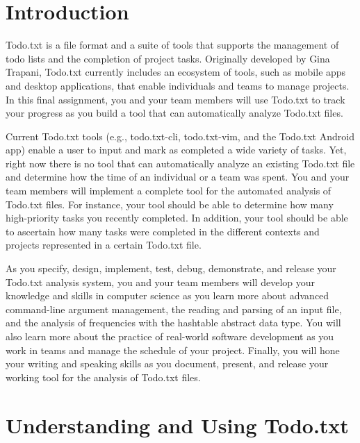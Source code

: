 


\usepackage[compact]{titlesec}


\section*{Introduction}

Todo.txt is a file format and a suite of tools that supports the management of todo lists and the completion of project
tasks. Originally developed by Gina Trapani, Todo.txt currently includes an ecosystem of tools, such as mobile apps and
desktop applications, that enable individuals and teams to manage projects. In this final assignment, you and your team
members will use Todo.txt to track your progress as you build a tool that can automatically analyze Todo.txt files.

Current Todo.txt tools (e.g., todo.txt-cli, todo.txt-vim, and the Todo.txt Android app) enable a user to input and mark
as completed a wide variety of tasks.  Yet, right now there is no tool that can automatically analyze an existing
Todo.txt file and determine how the time of an individual or a team was spent. You and your team members will implement
a complete tool for the automated analysis of Todo.txt files.  For instance, your tool should be able to determine how
many high-priority tasks you recently completed.  In addition, your tool should be able to ascertain how many tasks were
completed in the different contexts and projects represented in a certain Todo.txt file.

As you specify, design, implement, test, debug, demonstrate, and release your Todo.txt analysis system, you and your
team members will develop your knowledge and skills in computer science as you learn more about advanced command-line
argument management, the reading and parsing of an input file, and the analysis of frequencies with the hashtable
abstract data type. You will also learn more about the practice of real-world software development as you work in teams
and manage the schedule of your project. Finally, you will hone your writing and speaking skills as you document,
present, and release your working tool for the analysis of Todo.txt files.

\section*{Understanding and Using Todo.txt}

